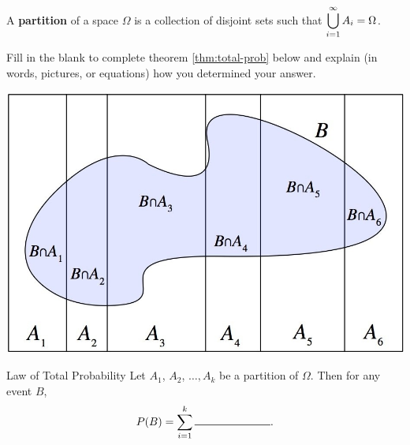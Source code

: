 




\clearpage


\bbox
\begin{definition}
A \textbf{partition} of a space $\Omega$ is a collection of disjoint sets such that $\displaystyle \bigcup_{i=1}^{\infty} A_i = \Omega$.
\end{definition}
\ebox



\bb[resume]

\ii Fill in the blank to complete theorem \ref{thm:total-prob} below and explain (in words, pictures, or equations) how you determined your answer.

\begin{multicols}{2}

\includegraphics[width=0.4\tw]{03/03-venn-totalprob.jpg}

\columnbreak
\bbox
\begin{theorem}{Law of Total Probability}\label{thm:total-prob}
Let $A_1$, $A_2$, $\ldots , A_k$ be a partition of $\Omega$. Then for any event $B$,
\[ P(B) = \sum_{i=1}^k \rule{0.2\tw}{0.5pt}.\]
\end{theorem}
\ebox

\end{multicols}
\ee

